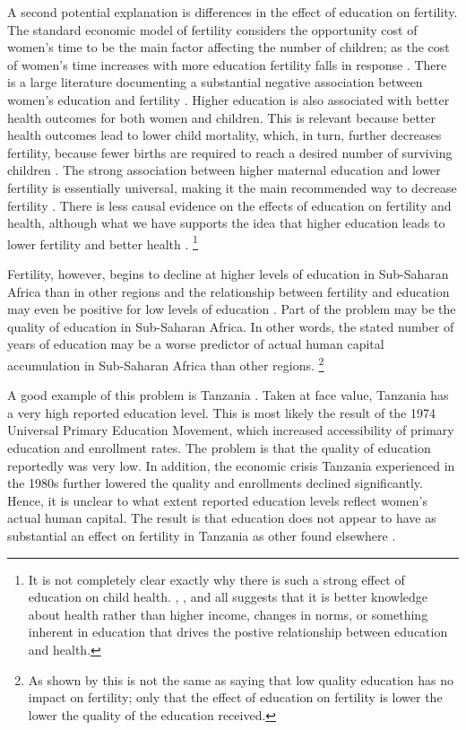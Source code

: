 \documentclass[letterpaper,12pt]{article}
\begin{document}
A second potential explanation is differences in the effect of education 
on fertility. 
The standard economic model of fertility considers the opportunity cost
of women's time to be the main factor affecting the number of children;
as the cost of women's time increases with more education fertility 
falls in response \citep{becker91}. 
There is a large literature documenting a substantial negative association 
between women's education and fertility \citep{strauss95}.
Higher education is also associated with better health outcomes for both 
women and children.
This is relevant because better health outcomes lead to lower child 
mortality, which, in turn, further decreases fertility, because fewer 
births are required to reach a desired number of surviving children 
\citep{Ainsworth1996}. 
The strong association between higher maternal education and lower fertility 
is essentially universal, making it the main recommended way to decrease 
fertility \citep{schultz02}.
There is less causal evidence on the effects of education on fertility
and health, although what we have supports the idea that higher education
leads to lower fertility and better health 
\citep{Breierova2004,Keats2016,Ozier2016}.%
\footnote{
It is not completely clear exactly why there is such a strong
effect of education on child health.
\citet{Thomas1991}, \citet{Glewwe1999}, and \citet{Kovsted2002}
all suggests that it is better knowledge about health rather 
than higher income, changes in norms, or something inherent in 
education that drives the postive relationship between education
and health.
} 

Fertility, however, begins to decline at higher levels of education in
Sub-Saharan Africa than in other regions and the relationship between
fertility and education may even be positive for low levels of education
\citep{Ainsworth1996,Benefo1996,Thomas1996}. 
Part of the problem may be the quality of education in Sub-Saharan
Africa. 
In other words, the stated number of years of education may be a worse
predictor of actual human capital accumulation in Sub-Saharan Africa
than other regions.%
\footnote{
As shown by \citet{Oye2016} this is not the same as saying that low
quality education has no impact on fertility; only that the effect of
education on fertility is lower the lower the quality of the education
received.}

A good example of this problem is Tanzania
\citep{Galabawa2001,Wedgwood2005}. 
Taken at face value, Tanzania has a very high reported education level. 
This is most likely the result of the 1974 Universal Primary Education
Movement, which increased accessibility of primary education and
enrollment rates. 
The problem is that the quality of education reportedly was very low. 
In addition, the economic crisis Tanzania experienced in the 1980s
further lowered the quality and enrollments declined significantly. 
Hence, it is unclear to what extent reported education levels reflect
women's actual human capital. 
The result is that education does not appear to have as substantial an
effect on fertility in Tanzania as other found elsewhere
\citep{Alam2016}.
\end{document}
